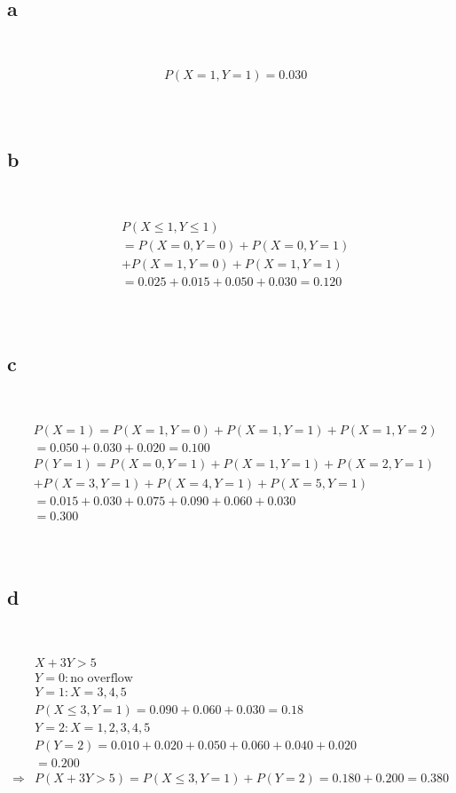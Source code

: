 \documentclass{article}
\begin{document}
~

\subsection*{a}

~

\begin{align*}
    &P(X=1,Y=1)=0.030\\
\end{align*}

~

\subsection*{b}

~

\begin{align*}
    &P(X\leqslant 1,Y\leqslant 1)\\
    &=P(X=0,Y=0)+P(X=0,Y=1)\\
    &+P(X=1,Y=0)+P(X=1,Y=1)\\
    &=0.025+0.015+0.050+0.030=0.120\\
\end{align*}

~

\subsection*{c}

~

\begin{align*}
    &P(X=1)=P(X=1,Y=0)+P(X=1,Y=1)+P(X=1,Y=2)\\
    &=0.050+0.030+0.020=0.100\\
    &P(Y=1)=P(X=0,Y=1)+P(X=1,Y=1)+P(X=2,Y=1)\\
    &+P(X=3,Y=1)+P(X=4,Y=1)+P(X=5,Y=1)\\
    &=0.015+0.030+0.075+0.090+0.060+0.030\\
    &=0.300\\
\end{align*}

~

\subsection*{d}

~

\begin{align*}
    &X+3Y>5\\
    &Y=0: \text{no overflow}\\
    &Y=1:X=3,4,5\\
    &P(X\leqslant 3,Y=1)=0.090+0.060+0.030=0.18\\
    &Y=2:X=1,2,3,4,5\\
    &P(Y=2)=0.010+0.020+0.050+0.060+0.040+0.020\\
    &=0.200\\
    \Rightarrow&P(X+3Y>5)=P(X\leqslant 3,Y=1)+P(Y=2)=0.180+0.200=0.380\\
\end{align*}
\end{document}
